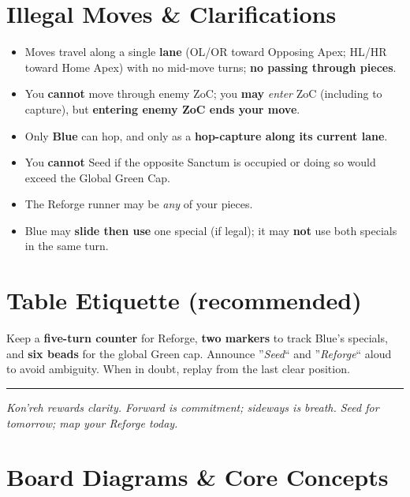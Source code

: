 \documentclass[11pt]{article}
\begin{document}
\section{Illegal Moves \& Clarifications}
\label{sec:clarifications}

\begin{itemize}
  \item Moves travel along a single \textbf{lane} (OL/OR toward Opposing Apex; HL/HR toward Home Apex) with no mid-move turns; \textbf{no passing through pieces}.
  \item You \textbf{cannot} move through enemy ZoC; you \textbf{may} \emph{enter} ZoC (including to capture), but \textbf{entering enemy ZoC ends your move}.
  \item Only \textbf{Blue} can hop, and only as a \textbf{hop-capture along its current lane}.
  \item You \textbf{cannot} Seed if the opposite Sanctum is occupied or doing so would exceed the Global Green Cap.
  \item The Reforge runner may be \emph{any} of your pieces.
  \item Blue may \textbf{slide then use} one special (if legal); it may \textbf{not} use both specials in the same turn.
\end{itemize}

\section{Table Etiquette (recommended)}
\label{sec:etiquette}


Keep a \textbf{five-turn counter} for Reforge, \textbf{two markers} to track Blue's specials, and \textbf{six beads} for the global Green cap. Announce ''\textit{Seed}`` and ''\textit{Reforge}`` aloud to avoid ambiguity. When in doubt, replay from the last clear position.

\vfill
\hrule
\small
\textit{Kon'reh rewards clarity. Forward is commitment; sideways is breath. Seed for tomorrow; map your Reforge today.}
\clearpage

\FloatBarrier
\needspace{0.80\textheight}


\section{Board Diagrams \& Core Concepts}
\vspace{-0.4\baselineskip}
\end{document}
